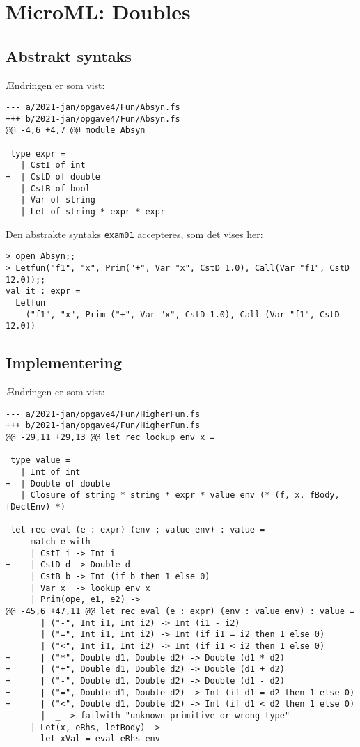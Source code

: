 \section{MicroML: Doubles}

\subsection{Abstrakt syntaks}

Ændringen er som vist:

\begin{verbatim}
--- a/2021-jan/opgave4/Fun/Absyn.fs
+++ b/2021-jan/opgave4/Fun/Absyn.fs
@@ -4,6 +4,7 @@ module Absyn
 
 type expr = 
   | CstI of int
+  | CstD of double
   | CstB of bool
   | Var of string
   | Let of string * expr * expr
\end{verbatim}

Den abstrakte syntaks \texttt{exam01} accepteres, som det vises her:

\begin{verbatim}
> open Absyn;;
> Letfun("f1", "x", Prim("+", Var "x", CstD 1.0), Call(Var "f1", CstD 12.0));;
val it : expr =
  Letfun
    ("f1", "x", Prim ("+", Var "x", CstD 1.0), Call (Var "f1", CstD 12.0))
\end{verbatim}

\subsection{Implementering}

Ændringen er som vist:

\begin{verbatim}
--- a/2021-jan/opgave4/Fun/HigherFun.fs
+++ b/2021-jan/opgave4/Fun/HigherFun.fs
@@ -29,11 +29,13 @@ let rec lookup env x =
 
 type value = 
   | Int of int
+  | Double of double
   | Closure of string * string * expr * value env (* (f, x, fBody, fDeclEnv) *)
 
 let rec eval (e : expr) (env : value env) : value =
     match e with
     | CstI i -> Int i
+    | CstD d -> Double d
     | CstB b -> Int (if b then 1 else 0)
     | Var x  -> lookup env x
     | Prim(ope, e1, e2) -> 
@@ -45,6 +47,11 @@ let rec eval (e : expr) (env : value env) : value =
       | ("-", Int i1, Int i2) -> Int (i1 - i2)
       | ("=", Int i1, Int i2) -> Int (if i1 = i2 then 1 else 0)
       | ("<", Int i1, Int i2) -> Int (if i1 < i2 then 1 else 0)
+      | ("*", Double d1, Double d2) -> Double (d1 * d2)
+      | ("+", Double d1, Double d2) -> Double (d1 + d2)
+      | ("-", Double d1, Double d2) -> Double (d1 - d2)
+      | ("=", Double d1, Double d2) -> Int (if d1 = d2 then 1 else 0)
+      | ("<", Double d1, Double d2) -> Int (if d1 < d2 then 1 else 0)
       |  _ -> failwith "unknown primitive or wrong type"
     | Let(x, eRhs, letBody) -> 
       let xVal = eval eRhs env
\end{verbatim}

